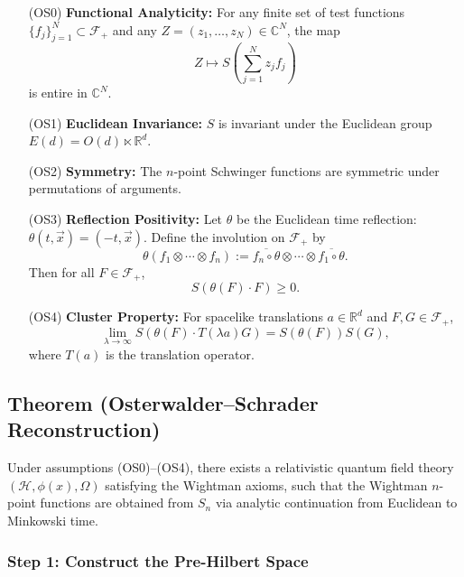 \documentclass{article}
\begin{document}
\begin{enumerate}
  \item[(OS0)] \textbf{Functional Analyticity:}  
  For any finite set of test functions $\{f_j\}_{j=1}^N \subset \mathcal{F}_+$ and any $Z = (z_1, \dots, z_N) \in \mathbb{C}^N$, the map
  \[
  Z \mapsto S\left( \sum_{j=1}^N z_j f_j \right)
  \]
  is entire in $\mathbb{C}^N$.

  \item[(OS1)] \textbf{Euclidean Invariance:}  
  $S$ is invariant under the Euclidean group $E(d) = O(d) \ltimes \mathbb{R}^d$.

  \item[(OS2)] \textbf{Symmetry:}  
  The $n$-point Schwinger functions are symmetric under permutations of arguments.

  \item[(OS3)] \textbf{Reflection Positivity:}  
  Let $\theta$ be the Euclidean time reflection: $\theta(t, \vec{x}) = (-t, \vec{x})$. Define the involution on $\mathcal{F}_+$ by
  \[
  \theta(f_1 \otimes \cdots \otimes f_n) := \overline{f_n \circ \theta} \otimes \cdots \otimes \overline{f_1 \circ \theta}.
  \]
  Then for all $F \in \mathcal{F}_+$,
  \[
  S(\theta(F) \cdot F) \geq 0.
  \]

  \item[(OS4)] \textbf{Cluster Property:}  
  For spacelike translations $a \in \mathbb{R}^d$ and $F, G \in \mathcal{F}_+$,
  \[
  \lim_{\lambda \to \infty} S(\theta(F) \cdot T(\lambda a) G) = S(\theta(F)) S(G),
  \]
  where $T(a)$ is the translation operator.
\end{enumerate}

\subsection*{Theorem (Osterwalder--Schrader Reconstruction)}

Under assumptions (OS0)--(OS4), there exists a relativistic quantum field theory $(\mathcal{H}, \phi(x), \Omega)$ satisfying the Wightman axioms, such that the Wightman $n$-point functions are obtained from $S_n$ via analytic continuation from Euclidean to Minkowski time.

\subsubsection*{Step 1: Construct the Pre-Hilbert Space}
\end{document}
